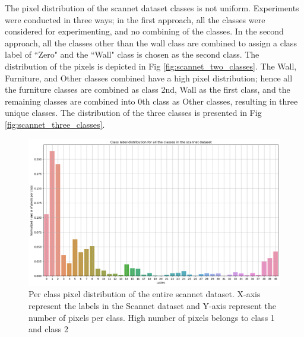 	The pixel distribution of the scannet dataset classes is not uniform. Experiments were conducted in three ways; in the first approach, all the classes were considered for experimenting, and no combining of the classes. In the second approach, all the classes other than the wall class are combined to assign a class label of ``Zero" and the ``Wall" class is chosen as the second class. The distribution of the pixels is depicted in Fig \ref{fig:scannet_two_classes}.
	The Wall, Furniture, and Other classes combined have a high pixel distribution; hence all the furniture classes are combined as class 2nd, Wall as the first class, and the remaining classes are combined into 0th class as Other classes, resulting in three unique classes. The distribution of the three classes is presented in Fig \ref{fig:scannet_three_classes}.
    
    \begin{figure}
    	\centering
    	\includegraphics[width=13cm]{images/scannet_data_class_distribution.png}
    	\caption{Per class pixel distribution of the entire scannet dataset. X-axis represent the labels in the Scannet dataset and Y-axis represent the number of pixels per class. High number of pixels belongs to class 1 and class 2}
    	\label{fig:scannet_class}
    \end{figure} 
    
